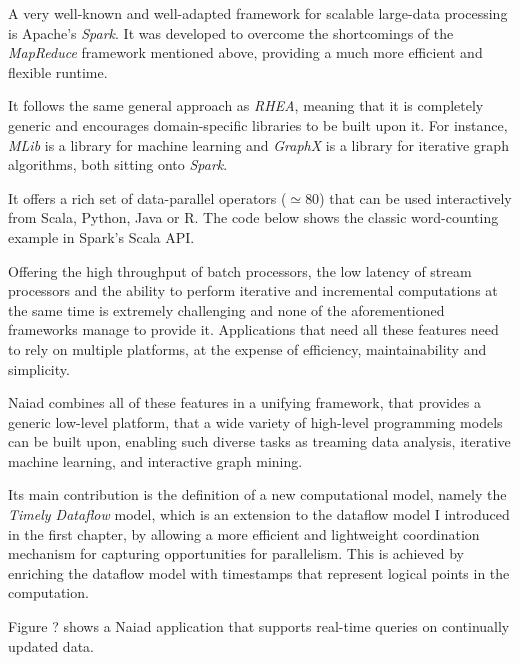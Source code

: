 \documentclass{dithesis}
\begin{document}


A very well-known and well-adapted framework for scalable large-data processing is Apache's \textit{Spark}. It was developed to overcome the shortcomings of the \textit{MapReduce} framework mentioned above, providing a much more efficient and flexible runtime.

It follows the same general approach as \textit{RHEA}, meaning that it is completely generic and encourages domain-specific libraries to be built upon it. For instance, \textit{MLib} is a library for machine learning and \textit{GraphX} is a library for iterative graph algorithms, both sitting onto \textit{Spark}.

It offers a rich set of data-parallel operators ($\simeq 80$) that can be used interactively from Scala, Python, Java or R. The code below shows the classic word-counting example in Spark's Scala API.



Offering the high throughput of batch processors, the low latency of stream processors and the ability to perform iterative and incremental computations at the same time is extremely challenging and none of the aforementioned frameworks manage to provide it. Applications that need all these features need to rely on multiple platforms, at the expense of efficiency, maintainability and simplicity.

Naiad\cite{naiad} combines all of these features in a unifying framework, that provides a generic low-level platform, that a wide variety of high-level programming models can be built upon, enabling such diverse tasks as treaming data analysis, iterative machine learning, and interactive graph mining.

Its main contribution is the definition of a new computational model, namely the \textit{Timely Dataflow} model, which is an extension to the dataflow model I introduced in the first chapter, by allowing a more efficient and lightweight coordination mechanism for capturing opportunities for parallelism. This is achieved by enriching the dataflow model with timestamps that represent logical points in the computation.

Figure ? shows a Naiad application that supports real-time queries on continually updated data.
\end{document}
